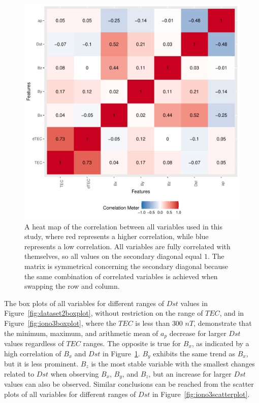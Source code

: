 \documentclass[sn-mathphys-num]{sn-jnl}%
\begin{document}
\begin{figure}
 \centering
 \includegraphics[width=0.9\linewidth]{correlation.pdf}
    \caption{A heat map of the correlation between all variables used in this study, where red represents a higher correlation, while blue represents a low correlation. All variables are fully correlated with themselves, so all values on the secondary diagonal equal $1$. The matrix is symmetrical concerning the secondary diagonal because the same combination of correlated variables is achieved when swapping the row and column.}
    \label{fig:correlation}
\end{figure}

The box plots of all variables for different ranges of $Dst$ values in Figure~\ref{fig:dataset2boxplot}, without restriction on the range of $TEC$, and in Figure~\ref{fig:iono3boxplot}, where the $TEC$ is less than $300$ $nT$, demonstrate that the minimum, maximum, and arithmetic mean of $a_{p}$ decrease for larger $Dst$ values regardless of $TEC$ ranges. The opposite is true for $B_{x}$, as indicated by a high correlation of $B_{x}$ and $Dst$ in Figure~\ref{fig:correlation}. $B_{y}$ exhibits the same trend as $B_{x}$, but it is less prominent. $B_{z}$ is the most stable variable with the smallest changes related to $Dst$ when observing $B_{x}$, $B_{y}$, and $B_{z}$, but an increase for larger $Dst$ values can also be observed. Similar conclusions can be reached from the scatter plots of all variables for different ranges of $Dst$ in Figure~\ref{fig:iono3scatterplot}. 
\end{document}
